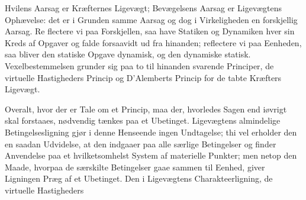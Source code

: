 \documentclass[12pt,a4paper]{book}
\begin{document}
Hvilens Aarsag er Kræfternes Ligevægt; Bevægelsens Aarsag er Ligevægtens
Ophævelse: det er i Grunden samme Aarsag og dog i Virkeligheden en
forskjellig Aarsag. Re\-%
flectere vi paa Forskjellen, saa have Statiken og Dynamiken hver sin
Kreds af Opgaver og falde forsaavidt ud fra hinanden; reflectere vi paa
Eenheden, saa bliver den statiske Opgave dynamisk, og den dynamiske
statisk. Vexelbestemmelsen grunder sig paa to til hinanden svarende
Principer, de virtuelle Hastigheders Princip og D'Alemberts Princip for
de tabte Kræfters Ligevægt.

Overalt, hvor der er Tale om et Princip, maa der, hvorledes Sagen end
iøvrigt skal forstaaes, nødvendig tænkes paa et Ubetinget. Ligevægtens
almindelige Betingelsesligning gjør i denne Henseende ingen Undtagelse;
thi vel erholder den en saadan Udvidelse, at den indgaaer paa alle
særlige Betingelser og finder Anvendelse paa et hvilketsomhelst System af
materielle Punkter; men netop den Maade, hvorpaa de særskilte Betingelser
gaae sammen til Eenhed, giver Ligningen Præg af et Ubetinget. Den i
Ligevægtens Charakteerligning, de virtuelle Hastigheders
\end{document}
